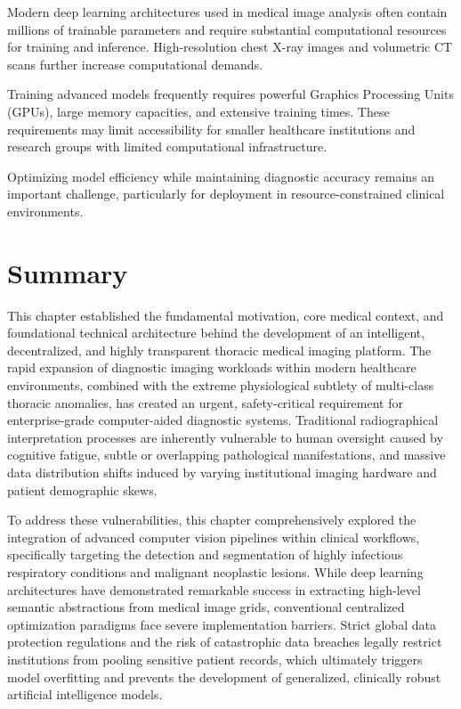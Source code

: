 Modern deep learning architectures used in medical image analysis often contain millions of trainable parameters and require substantial computational resources for training and inference. High-resolution chest X-ray images and volumetric CT scans further increase computational demands.

Training advanced models frequently requires powerful Graphics Processing Units (GPUs), large memory capacities, and extensive training times. These requirements may limit accessibility for smaller healthcare institutions and research groups with limited computational infrastructure.

Optimizing model efficiency while maintaining diagnostic accuracy remains an important challenge, particularly for deployment in resource-constrained clinical environments.

\section{Summary}
\label{sec:summary}

This chapter established the fundamental motivation, core medical context, and foundational technical architecture behind the development of an intelligent, decentralized, and highly transparent thoracic medical imaging platform. The rapid expansion of diagnostic imaging workloads within modern healthcare environments, combined with the extreme physiological subtlety of multi-class thoracic anomalies, has created an urgent, safety-critical requirement for enterprise-grade computer-aided diagnostic systems. Traditional radiographical interpretation processes are inherently vulnerable to human oversight caused by cognitive fatigue, subtle or overlapping pathological manifestations, and massive data distribution shifts induced by varying institutional imaging hardware and patient demographic skews.

To address these vulnerabilities, this chapter comprehensively explored the integration of advanced computer vision pipelines within clinical workflows, specifically targeting the detection and segmentation of highly infectious respiratory conditions and malignant neoplastic lesions. While deep learning architectures have demonstrated remarkable success in extracting high-level semantic abstractions from medical image grids, conventional centralized optimization paradigms face severe implementation barriers. Strict global data protection regulations and the risk of catastrophic data breaches legally restrict institutions from pooling sensitive patient records, which ultimately triggers model overfitting and prevents the development of generalized, clinically robust artificial intelligence models.

